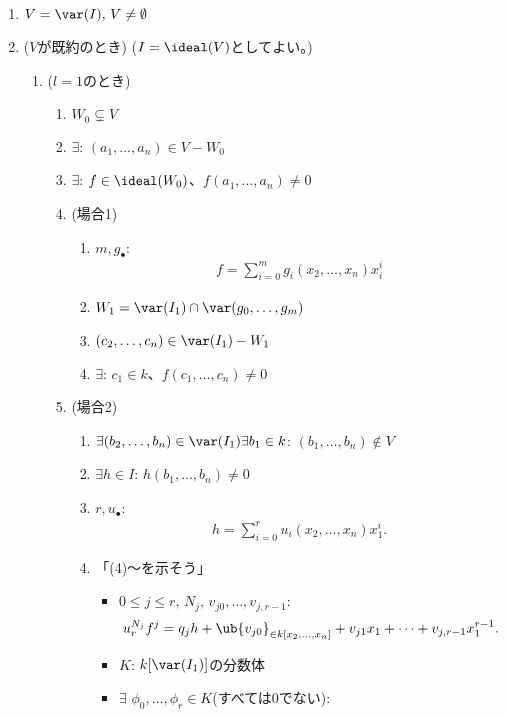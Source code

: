 \newpage
\begin{enumerate}
  \item $V=\var(I),\, V\neq \emptyset$
  \item
  ($V$が既約のとき) ($I=\ideal(V)$としてよい。)
  \begin{enumerate}
    \item ($l=1$のとき)
  \begin{enumerate}
    \item $W_0 \subsetneq V$
    \item $\exists$: $(a_1,\dots,a_n) \in V-W_0$
    \item $\exists$: $f\in \ideal(W_0)$、$f(a_1,\dots,a_n) \neq 0$
    \item (場合1)
    \begin{enumerate}
      \item $m,g_\bullet$:
      \begin{align}
        f=\sum_{i=0}^m g_i(x_2,\dots,x_n) x_i^i
      \end{align}
      \item $W_1 = \var(I_1)\cap \var(g_0,\dots,g_m)$
      \item $(c_2,\dots,c_n) \in \var(I_1)-W_1$
      \item $\exists$: $c_1 \in k$、$f(c_1,\dots,c_n) \neq 0$
    \end{enumerate}
    \item (場合2)
    \begin{enumerate}
      \item $\exists (b_2,\dots,b_n) \in \var(I_1) \exists b_1 \in k$:
      $(b_1,\dots,b_n) \notin V$
      \item $\exists h\in I$: $h(b_1,\dots,b_n) \neq 0$
      \item $r, u_\bullet$:
      \begin{align}
        h=\sum_{i=0}^r u_i(x_2,\dots,x_n) x_1^i.
      \end{align}
      \item 「(4)～を示そう」
      \begin{itemize}
        \item $0\le j\le r,\, N_j,\, v_{j0},\dots, v_{j,r-1}$:
        \begin{align}
          u_r^{N_j}f^j =
          q_j h + \ub{v_{j0}}_{\in k[x_2,\dots,x_n]} + v_{j1}x_1  + \dots + v_{j,r-1}x_1^{r-1}.
        \end{align}
        \item $K$: $k[\var(I_1)]$の分数体
        \item $\exists$ $\phi_0,\dots,\phi_r \in K$(すべては0でない):

\end{itemize}
\end{enumerate}
\end{enumerate}
\end{enumerate}
\end{enumerate}
